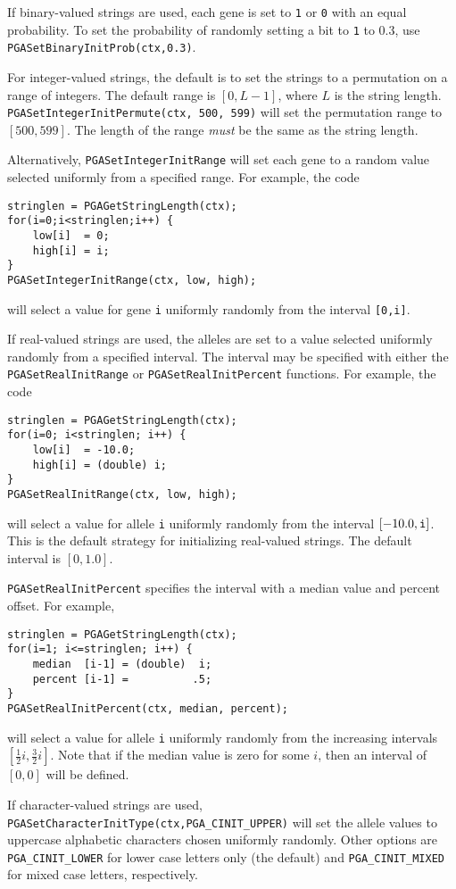 \documentclass{report}
\begin{document}
If binary-valued strings are used, each gene is set to {\tt 1} or {\tt 0} with
an equal probability.  To set the probability of randomly setting a bit to
{\tt 1} to 0.3, use {\tt PGASetBinaryInitProb(ctx,0.3)}.

For integer-valued strings, the default is to set the strings to a permutation
on a range of integers.  The default range is $[0,L-1]$, where $L$ is the
string length.  {\tt PGASetIntegerInitPermute(ctx, 500, 599)} will set the
permutation range to $[500,599]$.  The length of the range {\em must} be the
same as the string length.

Alternatively, {\tt PGASetIntegerInitRange} will set each gene to a random value
selected uniformly from a specified range.  For example, the code
\begin{verbatim}
stringlen = PGAGetStringLength(ctx);
for(i=0;i<stringlen;i++) {
    low[i]  = 0;
    high[i] = i;
}
PGASetIntegerInitRange(ctx, low, high);
\end{verbatim}
will select a value for gene {\tt i} uniformly randomly from the interval
{\tt [0,i]}.

If real-valued strings are used, the alleles are set to a value selected
uniformly randomly from a specified interval.  The interval may be specified
with either the {\tt PGASetRealInitRange} or {\tt PGASetRealInitPercent}
functions.
For example, the code
\begin{verbatim}
stringlen = PGAGetStringLength(ctx);
for(i=0; i<stringlen; i++) {
    low[i]  = -10.0;
    high[i] = (double) i;
}
PGASetRealInitRange(ctx, low, high);
\end{verbatim}
will select a value for allele {\tt i} uniformly randomly from the interval
$[-10.0,{\tt i}]$.  This is the default strategy for initializing real-valued
strings.  The default interval is $[0,1.0]$.

{\tt PGASetRealInitPercent} specifies the interval with a median value and
percent offset.  For example,
\begin{verbatim}
stringlen = PGAGetStringLength(ctx);
for(i=1; i<=stringlen; i++) {
    median  [i-1] = (double)  i;
    percent [i-1] =          .5;
}
PGASetRealInitPercent(ctx, median, percent);
\end{verbatim}
will select a value for allele {\tt i} uniformly randomly from the increasing
intervals $[\frac{1}{2}i,\frac{3}{2}i]$.  Note that if
the median value is zero for some $i$, then an
interval of $[0,0]$ will be defined.

If character-valued strings are used,
{\tt PGASetCharacterInitType(ctx,PGA\_CINIT\_UPPER)} will set the  allele values
to uppercase alphabetic characters chosen uniformly randomly.
Other options are
{\tt PGA\_CINIT\_LOWER} for lower case letters only (the default) and 
{\tt PGA\_CINIT\_MIXED} for mixed case letters, respectively.
\end{document}
